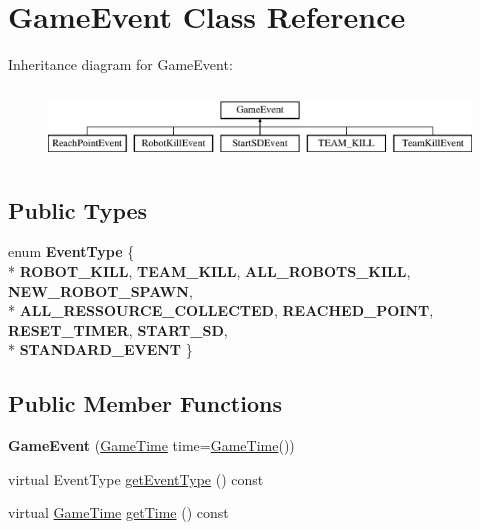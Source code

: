 \hypertarget{class_game_event}{}\section{Game\+Event Class Reference}
\label{class_game_event}
Inheritance diagram for Game\+Event\+:\begin{figure}[H]
\begin{center}
\leavevmode
\includegraphics[height=1.931034cm]{class_game_event}
\end{center}
\end{figure}
\subsection*{Public Types}
\begin{DoxyCompactItemize}
\item 
enum {\bfseries Event\+Type} \{ \\*
{\bfseries R\+O\+B\+O\+T\+\_\+\+K\+I\+LL}, 
{\bfseries T\+E\+A\+M\+\_\+\+K\+I\+LL}, 
{\bfseries A\+L\+L\+\_\+\+R\+O\+B\+O\+T\+S\+\_\+\+K\+I\+LL}, 
{\bfseries N\+E\+W\+\_\+\+R\+O\+B\+O\+T\+\_\+\+S\+P\+A\+WN}, 
\\*
{\bfseries A\+L\+L\+\_\+\+R\+E\+S\+S\+O\+U\+R\+C\+E\+\_\+\+C\+O\+L\+L\+E\+C\+T\+ED}, 
{\bfseries R\+E\+A\+C\+H\+E\+D\+\_\+\+P\+O\+I\+NT}, 
{\bfseries R\+E\+S\+E\+T\+\_\+\+T\+I\+M\+ER}, 
{\bfseries S\+T\+A\+R\+T\+\_\+\+SD}, 
\\*
{\bfseries S\+T\+A\+N\+D\+A\+R\+D\+\_\+\+E\+V\+E\+NT}
 \}\hypertarget{class_game_event_a2e8fe3fa81734632c5e121ea0143b72f}{}\label{class_game_event_a2e8fe3fa81734632c5e121ea0143b72f}

\end{DoxyCompactItemize}
\subsection*{Public Member Functions}
\begin{DoxyCompactItemize}
\item 
{\bfseries Game\+Event} (\hyperlink{class_game_time}{Game\+Time} time=\hyperlink{class_game_time}{Game\+Time}())\hypertarget{class_game_event_a300cc52bb8581fadd2384d8805961988}{}\label{class_game_event_a300cc52bb8581fadd2384d8805961988}

\item 
virtual Event\+Type \hyperlink{class_game_event_a7fbb5c78f90ff2d6ba905e827d416b24}{get\+Event\+Type} () const 
\item 
virtual \hyperlink{class_game_time}{Game\+Time} \hyperlink{class_game_event_a66ea9108338cbd86a2aa9a77a0306925}{get\+Time} () const 
\end{DoxyCompactItemize}
